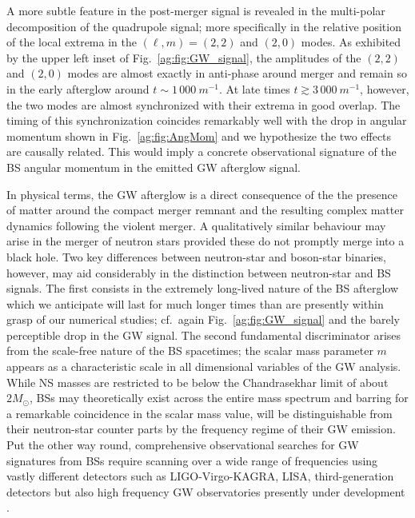 A more subtle feature in the post-merger signal is revealed in
the multi-polar decomposition of the quadrupole signal;
more specifically in the relative position of the local extrema
in the $(\ell,m)=(2,2)$ and $(2,0)$ modes. As exhibited by
the upper left inset of Fig.~\ref{ag:fig:GW_signal}, the amplitudes
of the $(2,2)$ and $(2,0)$ modes are almost exactly
in anti-phase around merger and remain so in the early afterglow
around $t\sim 1\,000~m^{-1}$. At late times
$t\gtrsim 3\,000~m^{-1}$, however, the
two modes are almost synchronized with their extrema
in good overlap.
The timing of this synchronization coincides remarkably well
with the drop in angular momentum shown in Fig.~\ref{ag:fig:AngMom}
and we hypothesize the two effects are causally related.
This would imply a concrete observational signature of the
BS angular momentum in the emitted GW afterglow signal.


In physical terms, the GW afterglow is a direct consequence
of the the presence of matter around the compact merger remnant
and the resulting complex matter dynamics following the violent
merger. A qualitatively similar behaviour may arise in the
merger of neutron stars provided these do not promptly merge
into a black hole. Two key differences between neutron-star
and boson-star binaries, however, may aid considerably in the
distinction between neutron-star and BS
signals. The first consists in the
extremely long-lived nature of the BS afterglow which we
anticipate will last for much longer times than are presently
within grasp of our numerical studies; cf.~again Fig.~\ref{ag:fig:GW_signal} and the barely perceptible
drop in the GW signal. The second fundamental discriminator
arises from the scale-free nature of the BS spacetimes;
the scalar mass parameter $m$ appears as a characteristic
scale in all dimensional variables of the GW analysis.
While NS masses are restricted to be below the Chandrasekhar limit of about $2 M_{\odot}$, BSs may theoretically exist
across the entire mass spectrum and barring for a remarkable
coincidence in the scalar mass value, will be distinguishable
from their neutron-star counter parts by the frequency regime
of their GW emission. Put the other way round, comprehensive
observational searches for GW signatures from BSs require
scanning over a wide range of frequencies using vastly
different detectors such as LIGO-Virgo-KAGRA, LISA,
third-generation detectors but also high frequency GW observatories presently under development \cite{Aggarwal:2020olq,Badurina:2019hst}.



